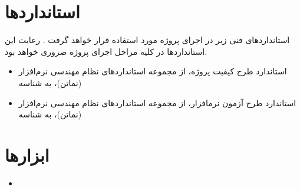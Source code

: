 \documentclass[12pt]{article}
\begin{document}
\section{استانداردها}
استانداردهای فنی زیر در اجرای پروژه مورد استفاده قرار خواهد گرفت . رعایت این استانداردها در کلیه مراحل اجرای پروژه ضروری خواهد بود.
\begin{itemize}
	\item
	استاندارد طرح کیفیت پروژه، از مجموعه استانداردهای نظام مهندسی نرم‌ا‌فزار 
	(نماتن)، به شناسه
\item
	استاندارد طرح آزمون نرمافزار، از مجموعه استانداردهای نظام مهندسی نرم‌افزار 
	(نماتن)، به شناسه 
\end{itemize}

\section{ابزارها}
\begin{itemize}
\item {}
\end{itemize}
\end{document}
